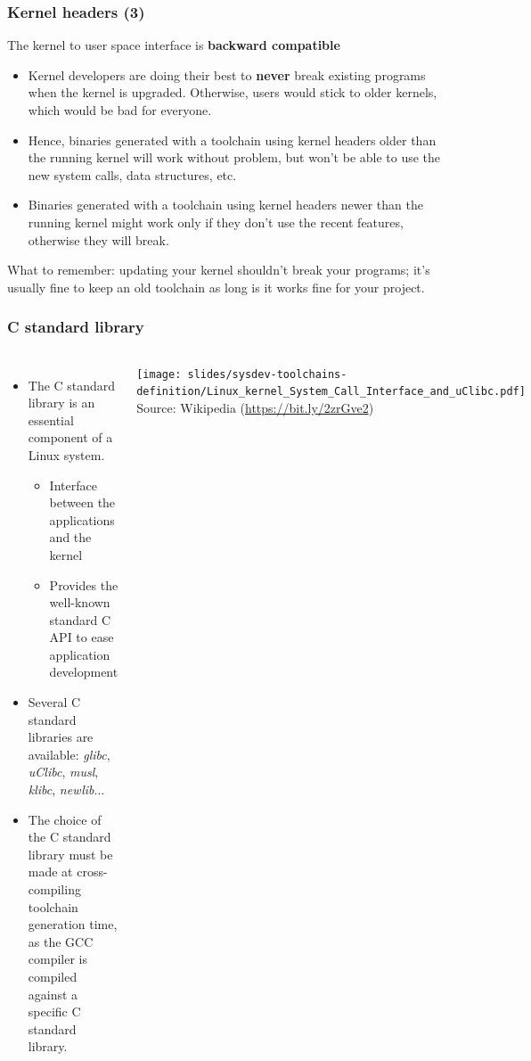 \begin{frame}[fragile]
  \frametitle{Kernel headers (3)}
  The kernel to user space interface is {\bf backward compatible}
  \begin{itemize}
  \item Kernel developers are doing their best to {\bf never}
        break existing programs when the kernel is upgraded.
        Otherwise, users would stick to older kernels, which
        would be bad for everyone.
  \item Hence, binaries generated with a toolchain using kernel headers
        older than the running kernel will work without problem, but
        won't be able to use the new system calls, data structures, etc.
  \item Binaries generated with a toolchain using kernel headers
        newer than the running kernel might work only if they don't use
        the recent features, otherwise they will break.
  \end{itemize}
  What to remember: updating your kernel shouldn't break your programs;
  it's usually fine to keep an old toolchain as long is it works fine
  for your project.
\end{frame}

\begin{frame}
  \frametitle{C standard library}
  \begin{columns}
    \begin{itemize}
    \item The C standard library is an essential component of a Linux
          system.
      \begin{itemize}
      \item Interface between the applications and the kernel
      \item Provides the well-known standard C API to ease application
        development
      \end{itemize}
    \item Several C standard libraries are available:
      {\em glibc}, {\em uClibc}, {\em musl}, {\em klibc}, {\em
        newlib}...
    \item The choice of the C standard library must be made at
      cross-compiling toolchain generation time, as the GCC compiler is
      compiled against a specific C standard library.
    \end{itemize}
    \texttt{[image: slides/sysdev-toolchains-definition/Linux\_kernel\_System\_Call\_Interface\_and\_uClibc.pdf]}\\
    {\tiny Source: Wikipedia (\url{https://bit.ly/2zrGve2})}
  \end{columns}
\end{frame}

